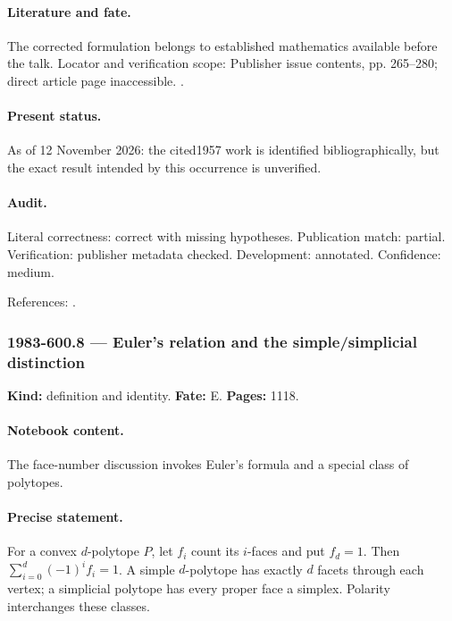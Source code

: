 \paragraph{Literature and fate.} The corrected formulation belongs to established mathematics available before the talk. Locator and verification scope: Publisher issue contents, pp. 265--280; direct article page inaccessible. \cite{horrocks1957schubert}.

\paragraph{Present status.} As of 12 November 2026: the cited1957 work is identified bibliographically, but the exact result intended by this occurrence is unverified.

\paragraph{Audit.} Literal correctness: correct with missing hypotheses. Publication match: partial. Verification: publisher metadata checked. Development: annotated. Confidence: medium.

\noindent References: \citep{horrocks1957schubert}.\par

\subsubsection{1983-600.8 --- Euler's relation and the simple/simplicial distinction}

\label{item:1983-600.8}

\noindent\textbf{Kind:} definition and identity. \textbf{Fate:} E. \textbf{Pages:} 1118.\par

\paragraph{Notebook content.} The face-number discussion invokes Euler's formula and a special class of polytopes.

\paragraph{Precise statement.} For a convex \(d\)-polytope \(P\), let \(f_i\) count its \(i\)-faces and put \(f_d=1\). Then \(\sum_{i=0}^d(-1)^if_i=1\). A simple \(d\)-polytope has exactly \(d\) facets through each vertex; a simplicial polytope has every proper face a simplex. Polarity interchanges these classes.

